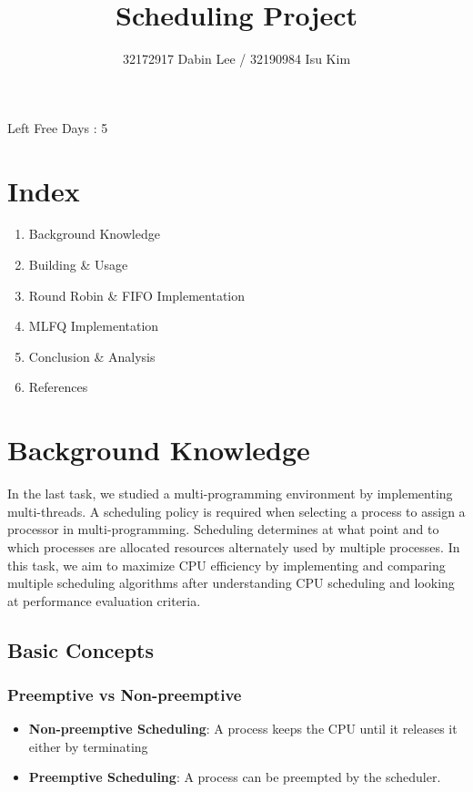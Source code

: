 \documentclass{homework}
\begin{document}
\title{Scheduling Project}
\author{32172917 Dabin Lee / 32190984 Isu Kim}
\maketitle

\newenvironment{code}{\captionsetup{type=listing}}{}

\maketitle
\begin{center}
Left Free Days : 5
\end{center}
\pagebreak

\section{Index}
\begin{enumerate}
   \item Background Knowledge
   \item Building \& Usage
   \item Round Robin & FIFO Implementation
   \item MLFQ Implementation
   \item Conclusion \& Analysis
   \item References
\end{enumerate}
\pagebreak

\setcounter{section}{0}
\section{Background Knowledge}
In the last task, we studied a multi-programming environment by implementing multi-threads. A scheduling policy is required when selecting a process to assign a processor in multi-programming. Scheduling determines at what point and to which processes are allocated resources alternately used by multiple processes. In this task, we aim to maximize CPU efficiency by implementing and comparing multiple scheduling algorithms after understanding CPU scheduling and looking at performance evaluation criteria.

\subsection{Basic Concepts}
\subsubsection{Preemptive vs Non-preemptive}
\begin{itemize}
    \item \textbf{Non-preemptive Scheduling}: A process keeps the CPU until it releases it either by terminating
    \item \textbf{Preemptive Scheduling}: A process can be preempted by the scheduler.
\end{itemize}
\end{document}
